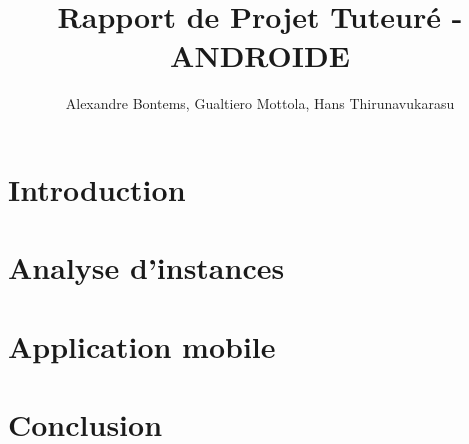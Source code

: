 \documentclass[a4paper, 11pt, titlepage]{article}
\title{Rapport de Projet Tuteuré - ANDROIDE}
\author{Alexandre Bontems, Gualtiero Mottola, Hans Thirunavukarasu}
\begin{document}
	
	\maketitle
	\tableofcontents
	\newpage

	\section{Introduction}
		
	\section{Analyse d'instances}
        
	\section{Application mobile}
	    
	\section{Conclusion}
	
	
\end{document}
